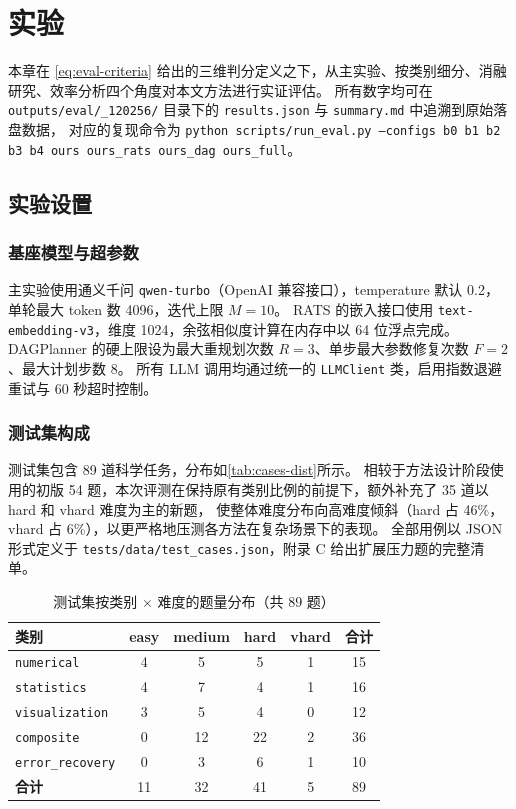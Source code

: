 \clearpage

\section{实验}

本章在 \autoref{eq:eval-criteria} 给出的三维判分定义之下，从主实验、按类别细分、消融研究、效率分析四个角度对本文方法进行实证评估。
所有数字均可在 \texttt{outputs/\allowbreak eval/\_120256/} 目录下的 \texttt{results.json} 与 \texttt{summary.md} 中追溯到原始落盘数据，
对应的复现命令为 \texttt{python scripts/\allowbreak run\_eval.py --configs b0 b1 b2 b3 b4 ours ours\_rats ours\_dag ours\_full}。

\subsection{实验设置}\label{sec:exp-setup}

\subsubsection{基座模型与超参数}

主实验使用通义千问 \texttt{qwen-turbo}（OpenAI 兼容接口），temperature 默认 0.2，单轮最大 token 数 4096，迭代上限 $M=10$。
RATS 的嵌入接口使用 \texttt{text-embedding-v3}，维度 1024，余弦相似度计算在内存中以 64 位浮点完成。
DAGPlanner 的硬上限设为最大重规划次数 $R=3$、单步最大参数修复次数 $F=2$、最大计划步数 8。
所有 LLM 调用均通过统一的 \texttt{LLMClient} 类，启用指数退避重试与 60 秒超时控制。

\subsubsection{测试集构成}

测试集包含 89 道科学任务，分布如\autoref{tab:cases-dist}所示。
相较于方法设计阶段使用的初版 54 题，本次评测在保持原有类别比例的前提下，额外补充了 35 道以 hard 和 vhard 难度为主的新题，
使整体难度分布向高难度倾斜（hard 占 46\%，vhard 占 6\%），以更严格地压测各方法在复杂场景下的表现。
全部用例以 JSON 形式定义于 \texttt{tests/data/test\_cases.json}，附录 C 给出扩展压力题的完整清单。

\begin{table}[htbp]
    \centering
    \caption{\label{tab:cases-dist}测试集按类别 $\times$ 难度的题量分布（共 89 题）}
    \begin{tabular}{lccccc}
        \toprule
        类别 & easy & medium & hard & vhard & 合计 \\ \midrule
        \texttt{numerical}      & 4 & 5 & 5 & 1 & 15 \\
        \texttt{statistics}     & 4 & 7 & 4 & 1 & 16 \\
        \texttt{visualization}  & 3 & 5 & 4 & 0 & 12 \\
        \texttt{composite}      & 0 & 12 & 22 & 2 & 36 \\
        \texttt{error\_recovery} & 0 & 3 & 6 & 1 & 10 \\
        \textbf{合计} & 11 & 32 & 41 & 5 & 89 \\ \bottomrule
    \end{tabular}
\end{table}

